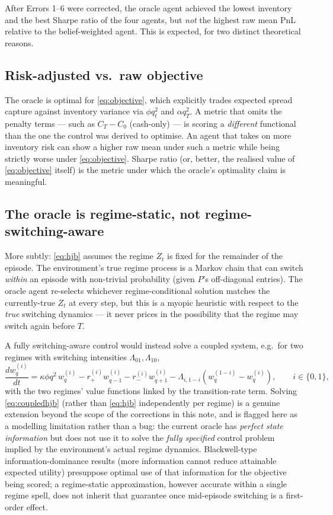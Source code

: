 \documentclass[11pt]{article}
\begin{document}
After Errors 1--6 were corrected, the oracle agent achieved the lowest inventory and the best Sharpe ratio of the four agents, but \emph{not} the highest raw mean PnL relative to the belief-weighted agent. This is expected, for two distinct theoretical reasons.

\subsection{Risk-adjusted vs.\ raw objective}
The oracle is optimal for \eqref{eq:objective}, which explicitly trades expected spread capture against inventory variance via $\phi q_t^2$ and $\alpha q_T^2$. A metric that omits the penalty terms — such as $C_T - C_0$ (cash-only) — is scoring a \emph{different} functional than the one the control was derived to optimise. An agent that takes on more inventory risk can show a higher raw mean under such a metric while being strictly worse under \eqref{eq:objective}. Sharpe ratio (or, better, the realised value of \eqref{eq:objective} itself) is the metric under which the oracle's optimality claim is meaningful.

\subsection{The oracle is regime-static, not regime-switching-aware}
More subtly: \eqref{eq:hjb} assumes the regime $Z_t$ is fixed for the remainder of the episode. The environment's true regime process is a Markov chain that can switch \emph{within} an episode with non-trivial probability (given $P$'s off-diagonal entries). The oracle agent re-selects whichever regime-conditional solution matches the currently-true $Z_t$ at every step, but this is a myopic heuristic with respect to the \emph{true} switching dynamics — it never prices in the possibility that the regime may switch again before $T$.

A fully switching-aware control would instead solve a coupled system, e.g.\ for two regimes with switching intensities $\Lambda_{01}, \Lambda_{10}$,
\begin{equation}
\frac{dw_q^{(i)}}{dt} = \kappa \phi q^2\, w_q^{(i)} - r_+^{(i)} w_{q-1}^{(i)} - r_-^{(i)} w_{q+1}^{(i)} - \Lambda_{i,1-i}\left(w_q^{(1-i)} - w_q^{(i)}\right), \qquad i \in \{0,1\},
\label{eq:coupledhjb}
\end{equation}
with the two regimes' value functions linked by the transition-rate term. Solving \eqref{eq:coupledhjb} (rather than \eqref{eq:hjb} independently per regime) is a genuine extension beyond the scope of the corrections in this note, and is flagged here as a modelling limitation rather than a bug: the current oracle has \emph{perfect state information} but does not use it to solve the \emph{fully specified} control problem implied by the environment's actual regime dynamics. Blackwell-type information-dominance results (more information cannot reduce attainable expected utility) presuppose optimal use of that information for the objective being scored; a regime-static approximation, however accurate within a single regime spell, does not inherit that guarantee once mid-episode switching is a first-order effect.
\end{document}
